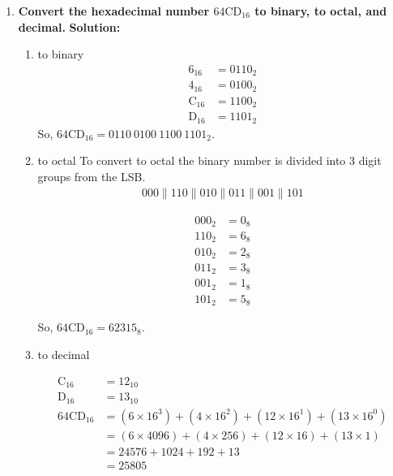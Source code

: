 \documentclass{article}
\begin{document}
\begin{enumerate}[label=\textbf{\arabic*.}]
    \item \textbf{Convert the hexadecimal number \(\text{64CD}_{16}\) to binary, to octal, and decimal.}\newline
    \textbf{Solution:} \newline
    \begin{enumerate}[label=\textbf{\alph*.}]
        \item to binary \newline
        \begin{align*}
            \text{6}_{16} &= 0110_2 \\
            \text{4}_{16} &= 0100_2 \\
            \text{C}_{16} &= 1100_2 \\
            \text{D}_{16} &= 1101_2 
        \end{align*}
        So, \(\text{64CD}_{16} = 0110\ 0100\ 1100\ 1101_2\).
    
        \item to octal \newline
        To convert to octal the binary number is divided into 3 digit groups from the LSB.
        \begin{align*}
            000 \parallel 110 \parallel 010 \parallel 011 \parallel 001 \parallel 101
        \end{align*}



        \begin{align*}
            000_2 &= 0_8 \\
            110_2 &= 6_8 \\
            010_2 &= 2_8 \\
            011_2 &= 3_8 \\
            001_2 &= 1_8 \\
            101_2 &= 5_8
        \end{align*}

        So, \(\text{64CD}_{16} = 62315_8\).

        \item to decimal \newline
        
        \begin{align*}
            \text{C}_{16} &= 12_{10} \\
            \text{D}_{16} &= 13_{10} \\
            \text{64CD}_{16} &= (6 \times 16^3) + (4 \times 16^2) + (12 \times 16^1) + (13 \times 16^0) \\
            &= (6 \times 4096) + (4 \times 256) + (12 \times 16) + (13 \times 1) \\
            &= 24576 + 1024 + 192 + 13 \\
            &= 25805
        \end{align*}


\end{enumerate}
\end{enumerate}
\end{document}

